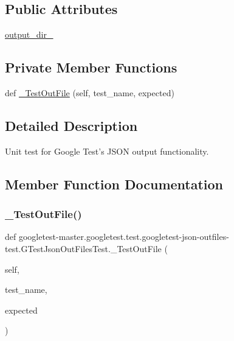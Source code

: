 \subsection*{Public Attributes}
\begin{DoxyCompactItemize}
\item 
\mbox{\hyperlink{classgoogletest-master_1_1googletest_1_1test_1_1googletest-json-outfiles-test_1_1_g_test_json_out_files_test_a7426e9536c846c20a04c3a34509add7a}{output\+\_\+dir\+\_\+}}
\end{DoxyCompactItemize}
\subsection*{Private Member Functions}
\begin{DoxyCompactItemize}
\item 
def \mbox{\hyperlink{classgoogletest-master_1_1googletest_1_1test_1_1googletest-json-outfiles-test_1_1_g_test_json_out_files_test_a52c89fbdc4ca072b5d2a7d02b2a8e2bc}{\+\_\+\+Test\+Out\+File}} (self, test\+\_\+name, expected)
\end{DoxyCompactItemize}


\subsection{Detailed Description}
\begin{DoxyVerb}Unit test for Google Test's JSON output functionality.\end{DoxyVerb}
 

\subsection{Member Function Documentation}
\mbox{\label{classgoogletest-master_1_1googletest_1_1test_1_1googletest-json-outfiles-test_1_1_g_test_json_out_files_test_a52c89fbdc4ca072b5d2a7d02b2a8e2bc}} 
\subsubsection{\texorpdfstring{\_TestOutFile()}{\_TestOutFile()}}
{\footnotesize\ttfamily def googletest-\/master.\+googletest.\+test.\+googletest-\/json-\/outfiles-\/test.\+G\+Test\+Json\+Out\+Files\+Test.\+\_\+\+Test\+Out\+File (\begin{DoxyParamCaption}\item[{}]{self,  }\item[{}]{test\+\_\+name,  }\item[{}]{expected }\end{DoxyParamCaption})\hspace{0.3cm}{\ttfamily [private]}}


